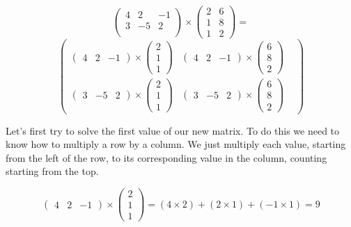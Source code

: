 \[\begin{pmatrix}4&2&-1\\3&-5&2\\\end{pmatrix}\times
\begin{pmatrix}2&6\\1&8\\1&2\end{pmatrix}=\] \[
\begin{pmatrix}
    \begin{pmatrix}4&2&-1\end{pmatrix}\times
    \begin{pmatrix}2\\1\\1\end{pmatrix}
&
    \begin{pmatrix}4&2&-1\end{pmatrix}\times
    \begin{pmatrix}6\\8\\2\end{pmatrix}
\\
    \begin{pmatrix}3&-5&2\end{pmatrix}\times
    \begin{pmatrix}2\\1\\1\end{pmatrix}
&
    \begin{pmatrix}3&-5&2\end{pmatrix}\times
    \begin{pmatrix}6\\8\\2\end{pmatrix}
&\end{pmatrix}
\]

Let's first try to solve the first value of our new matrix. To do this we need to know how to multiply a row by a column. We just multiply each value, starting from the left of the row, to its corresponding value in the column, counting starting from the top.

\[\begin{pmatrix}4&2&-1\end{pmatrix}\times
\begin{pmatrix}2\\1\\1\end{pmatrix}=
(4\times2)+(2\times1)+(-1\times1)=9\]

